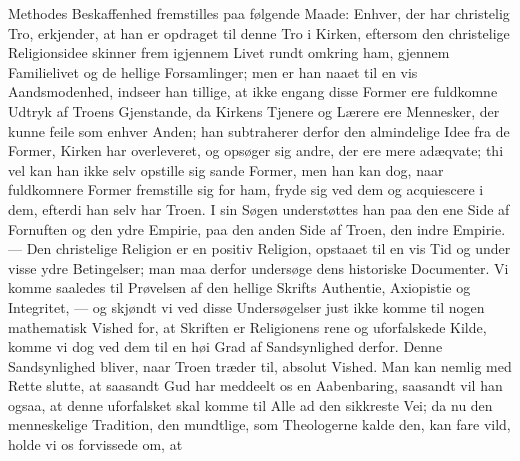 \documentclass[12pt]{book}
\newcommand{\opage}[1]{\marginnote{\footnotesize\textit{[#1]}}}
\begin{document}
Methodes Beskaffenhed
\opage{100} fremstilles paa følgende Maade: Enhver, der har christelig Tro, erkjender, at
han er opdraget til denne Tro i Kirken, eftersom den christelige Religionsidee
skinner frem igjennem Livet rundt omkring ham, gjennem Familielivet og de
hellige Forsamlinger; men er han naaet til en vis Aandsmodenhed, indseer han
tillige, at ikke engang disse Former ere fuldkomne Udtryk af Troens
Gjenstande, da Kirkens Tjenere og Lærere ere Mennesker, der kunne feile som
enhver Anden; han subtraherer derfor den almindelige Idee fra de Former,
Kirken har overleveret, og opsøger sig andre, der ere mere adæqvate; thi vel
kan han ikke selv opstille sig sande Former, men han kan dog, naar
fuldkomnere Former fremstille sig for ham, fryde sig ved dem og acquiescere i
dem, efterdi han selv har Troen. I sin Søgen understøttes han paa den ene
Side af Fornuften og den ydre Empirie, paa den anden Side af Troen, den indre
Empirie. --- Den christelige Religion er en positiv Religion, opstaaet til en
vis Tid og under visse ydre Betingelser; man maa derfor undersøge dens
historiske Documenter. Vi komme saaledes til Prøvelsen af den hellige Skrifts
Authentie, Axiopistie og Integritet, --- og skjøndt vi ved disse Undersøgelser
just ikke komme til nogen mathematisk Vished for, at Skriften er Religionens
rene og uforfalskede Kilde, komme vi dog ved dem til en høi Grad af
Sandsynlighed derfor. Denne Sandsynlighed bliver, naar Troen træder til,
absolut Vished. Man kan nemlig med Rette slutte, at saasandt Gud har meddeelt
os en Aabenbaring, saasandt vil han ogsaa, at denne uforfalsket skal komme til
Alle ad den sikkreste Vei; da nu den menneskelige Tradition, den mundtlige,
som Theologerne kalde den, kan fare vild, holde vi os forvissede om, at
\end{document}
